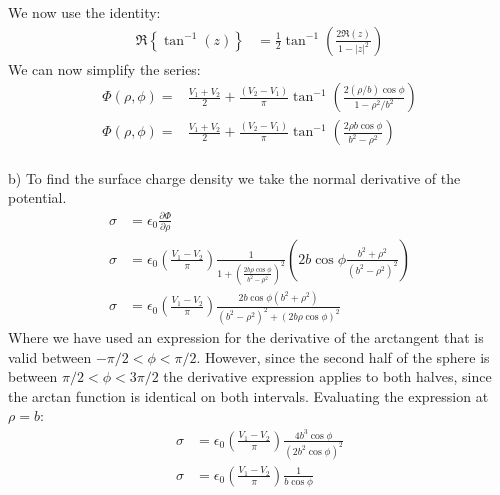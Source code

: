 \documentclass[a4paper,11pt]{article}
\numberwithin{equation}{section}
\newcommand{\ez}{\epsilon_0}
\newcommand{\lrp}[1]{\left({#1}\right)}
\newcommand{\lrb}[1]{\left\{{#1}\right\}}
\begin{document}
We now use the identity:
\begin{align}
 \Re\lrb{\tan^{-1}(z)} &= \frac{1}{2}\tan^{-1}\lrp{\frac{2\Re(z)}{1-|z|^2}}
\end{align}
We can now simplify the series:
\begin{align}
 \Phi(\rho,\phi) = &\frac{V_1+V_2}{2}+\frac{(V_2-V_1)}{\pi}\tan^{-1}\lrp{\frac{2(\rho/b)\cos{\phi}}{1-\rho^2/b^2}}\\
 \Phi(\rho,\phi) = &\frac{V_1+V_2}{2}+\frac{(V_2-V_1)}{\pi}\tan^{-1}\lrp{\frac{2\rho b \cos{\phi}}{b^2-\rho^2}}
\end{align}
\\
b) To find the surface charge density we take the normal derivative of the potential.
\begin{align}
 \sigma &= \ez\frac{\partial \Phi}{\partial \rho}\\
 \sigma &= \ez\lrp{\frac{V_1-V_2}{\pi}}\frac{1}{1+\lrp{\frac{2b\rho\cos{\phi}}{b^2-\rho^2}}^2}\lrp{2b\cos{\phi}\frac{b^2+\rho^2}{(b^2-\rho^2)^2}}\\
 \sigma &= \ez\lrp{\frac{V_1-V_2}{\pi}}\frac{2b\cos{\phi}(b^2+\rho^2)}{(b^2-\rho^2)^2+(2b\rho\cos{\phi})^2}
\end{align}
Where we have used an expression for the derivative of the arctangent that is valid between $-\pi/2<\phi<\pi/2$.
However, since the second half of the sphere is between $\pi/2<\phi<3\pi/2$ the derivative expression applies to both halves, since the arctan function is identical on both intervals.
Evaluating the expression at $\rho=b$:
\begin{align}
 \sigma &= \ez\lrp{\frac{V_1-V_2}{\pi}}\frac{4b^3\cos{\phi}}{(2b^2\cos{\phi})^2}\\
 \sigma &= \ez\lrp{\frac{V_1-V_2}{\pi}}\frac{1}{b\cos{\phi}}
\end{align}
\end{document}
